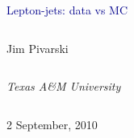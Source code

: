 \documentclass[compress]{beamer}
\begin{document}
\begin{frame}
\vfill
\begin{center}
\textcolor{darkblue}{\Large Lepton-jets: data vs MC}

\vfill
\begin{columns}
\begin{center}
\large
Jim Pivarski
\end{center}
\end{columns}

\begin{columns}
\begin{center}
\scriptsize
{\it Texas A\&M University}
\end{center}
\end{columns}

\vfill
 2 September, 2010

\end{center}
\end{frame}


\small
\end{document}
